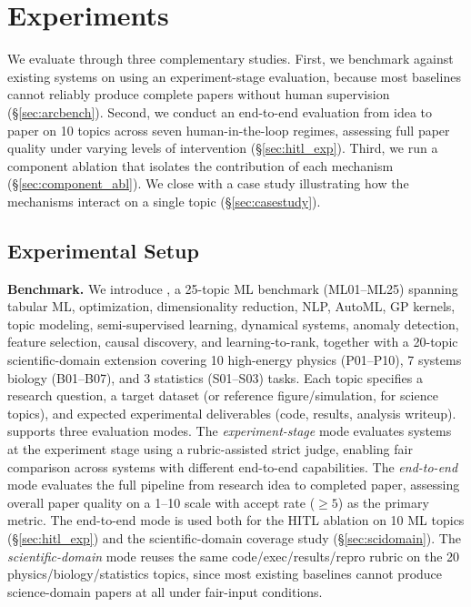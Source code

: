\vspace{-0.5em}
\section{Experiments}
\label{sec:experiments}
\vspace{-0.5em}

We evaluate \system{} through three complementary studies. First, we benchmark against existing systems on \bench{} using an experiment-stage evaluation, because most baselines cannot reliably produce complete papers without human supervision (\S\ref{sec:arcbench}). Second, we conduct an end-to-end evaluation from idea to paper on 10 \bench{} topics across seven human-in-the-loop regimes, assessing full paper quality under varying levels of intervention (\S\ref{sec:hitl_exp}). Third, we run a component ablation that isolates the contribution of each mechanism (\S\ref{sec:component_abl}). We close with a case study illustrating how the mechanisms interact on a single topic (\S\ref{sec:casestudy}).


\subsection{Experimental Setup}
\label{sec:setup}
\vspace{-0.3em}

\noindent \textbf{Benchmark.} We introduce \bench, a 25-topic ML benchmark (\textsc{ML01}--\textsc{ML25}) spanning tabular ML, optimization, dimensionality reduction, NLP, AutoML, GP kernels, topic modeling, semi-supervised learning, dynamical systems, anomaly detection, feature selection, causal discovery, and learning-to-rank, together with a 20-topic scientific-domain extension covering 10 high-energy physics (\textsc{P01}--\textsc{P10}), 7 systems biology (\textsc{B01}--\textsc{B07}), and 3 statistics (\textsc{S01}--\textsc{S03}) tasks. Each topic specifies a research question, a target dataset (or reference figure/simulation, for science topics), and expected experimental deliverables (code, results, analysis writeup). \bench{} supports three evaluation modes. The \emph{experiment-stage} mode evaluates systems at the experiment stage using a rubric-assisted strict judge, enabling fair comparison across systems with different end-to-end capabilities. The \emph{end-to-end} mode evaluates the full pipeline from research idea to completed paper, assessing overall paper quality on a 1--10 scale with accept rate ($\geq 5$) as the primary metric. The end-to-end mode is used both for the HITL ablation on 10 \textsc{ML} topics (\S\ref{sec:hitl_exp}) and the scientific-domain coverage study (\S\ref{sec:scidomain}). The \emph{scientific-domain} mode reuses the same code/exec/results/repro rubric on the 20 physics/biology/statistics topics, since most existing baselines cannot produce science-domain papers at all under fair-input conditions.

